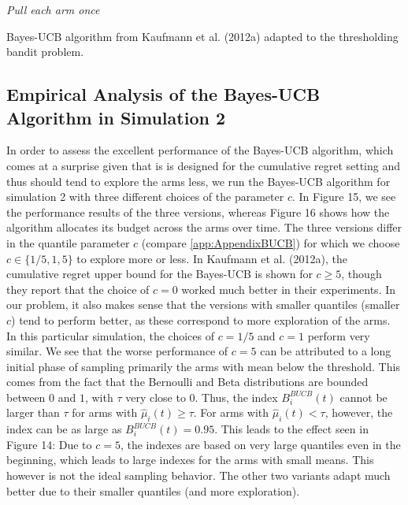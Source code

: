 \documentclass[11pt,]{article}
\begin{document}
\begin{algorithm}
\BlankLine
\emph{Pull each arm once}\;
\caption{Bayes-UCB algorithm from Kaufmann et al. (2012a) adapted to the thresholding bandit problem.}\label{bayesucb_tbp}
\end{algorithm}

\DecMargin{1em}

\subsection{Empirical Analysis of the Bayes-UCB Algorithm in Simulation
2}\label{empirical-analysis-of-the-bayes-ucb-algorithm-in-simulation-2}

In order to assess the excellent performance of the Bayes-UCB algorithm,
which comes at a surprise given that is is designed for the cumulative
regret setting and thus should tend to explore the arms less, we run the
Bayes-UCB algorithm for simulation 2 with three different choices of the
parameter \(c\). In Figure 15, we see the performance results of the
three versions, whereas Figure 16 shows how the algorithm allocates its
budget across the arms over time. The three versions differ in the
quantile parameter \(c\) (compare \autoref{app:AppendixBUCB}) for which
we choose \(c \in \{1/5, 1, 5\}\) to explore more or less. In Kaufmann
et al. (2012a), the cumulative regret upper bound for the Bayes-UCB is
shown for \(c\geq 5\), though they report that the choice of \(c=0\)
worked much better in their experiments. In our problem, it also makes
sense that the versions with smaller quantiles (smaller \(c\)) tend to
perform better, as these correspond to more exploration of the arms. In
this particular simulation, the choices of \(c=1/5\) and \(c=1\) perform
very similar. We see that the worse performance of \(c=5\) can be
attributed to a long initial phase of sampling primarily the arms with
mean below the threshold. This comes from the fact that the Bernoulli
and Beta distributions are bounded between \(0\) and \(1\), with
\(\tau\) very close to \(0\). Thus, the index \(B_i^{BUCB}(t)\) cannot
be larger than \(\tau\) for arms with \(\hat{\mu}_i(t) \geq \tau\). For
arms with \(\hat{\mu}_i(t) < \tau\), however, the index can be as large
as \(B_i^{BUCB}(t) = 0.95\). This leads to the effect seen in Figure 14:
Due to \(c=5\), the indexes are based on very large quantiles even in
the beginning, which leads to large indexes for the arms with small
means. This however is not the ideal sampling behavior. The other two
variants adapt much better due to their smaller quantiles (and more
exploration).
\end{document}
